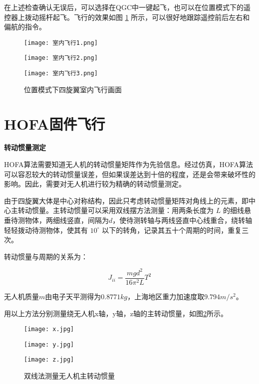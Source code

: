 \newpage

在上述检查确认无误后，可以选择在QGC中一键起飞，也可以在位置模式下的遥控器上拨动摇杆起飞。飞行的效果如图 \ref{室内飞行} 所示，可以很好地跟踪遥控前后左右和偏航的指令。

\begin{figure}[h]
  \centering
  \begin{minipage}[c]{0.33\textwidth}
    \centering
    \texttt{[image: 室内飞行1.png]}
  \end{minipage} \hfill
  \begin{minipage}[c]{0.33\textwidth}
    \centering
    \texttt{[image: 室内飞行2.png]}
  \end{minipage}\hfill
    \begin{minipage}[c]{0.33\textwidth}
      \centering
      \texttt{[image: 室内飞行3.png]}
  \end{minipage}
  \caption{位置模式下四旋翼室内飞行画面}
  \label{室内飞行}
  \end{figure}

  \section{HOFA固件飞行}

  \textbf{转动惯量测定}

  HOFA算法需要知道无人机的转动惯量矩阵作为先验信息。经过仿真，HOFA算法可以容忍较大的转动惯量误差，但如果误差达到十倍的程度，还是会带来破坏性的影响。因此，需要对无人机进行较为精确的转动惯量测定。

  由于四旋翼大体是中心对称结构，因此只考虑转动惯量矩阵对角线上的元素，即中心主转动惯量。主转动惯量可以采用双线摆方法测量\cite{转动惯量}：用两条长度为 $L$ 的细线悬垂待测物体，两细线竖直，间隔为$d$，使待测转轴与两线竖直中心线重合，绕转轴轻轻拨动待测物体，使其有 $10 ^\circ$ 以下的转角，记录其五十个周期的时间，重复三次。

  转动惯量与周期的关系为：

  $$
  J_{ii}=\frac{mgd^2}{16 \pi^2 L} T^2
  $$

  无人机质量$m$由电子天平测得为$0.8771kg$，上海地区重力加速度取$9.794 m/s^2$。

  用以上方法分别测量绕无人机x轴，y轴，z轴的主转动惯量，如图\ref{双线法}所示。

  \begin{figure}[h]
    \centering
    \begin{minipage}[c]{0.33\textwidth}
      \centering
      \texttt{[image: x.jpg]}
    \end{minipage} \hfill
    \begin{minipage}[c]{0.33\textwidth}
      \centering
      \texttt{[image: y.jpg]}
    \end{minipage}\hfill
      \begin{minipage}[c]{0.33\textwidth}
        \centering
        \texttt{[image: z.jpg]}
    \end{minipage}
    \caption{双线法测量无人机主转动惯量}
    \label{双线法}
    \end{figure}

